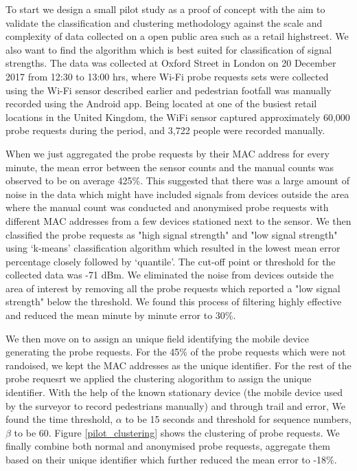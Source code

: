To start we design a small pilot study as a proof of concept with the aim to validate the classification and clustering methodology against the scale and complexity of data collected on a open public area such as a retail highstreet.
We also want to find the algorithm which is best suited for classification of signal strengths.
The data was collected at Oxford Street in London on 20 December 2017 from 12:30 to 13:00 hrs, where Wi-Fi probe requests sets were collected using the Wi-Fi sensor described earlier and pedestrian footfall was manually recorded using the Android app.
Being located at one of the busiest retail locations in the United Kingdom, the WiFi sensor captured approximately 60,000 probe requests during the period, and 3,722 people were recorded manually.

When we just aggregated the probe requests by their MAC address for every minute, the mean error between the sensor counts and the manual counts was observed to be on average 425\%.
This suggested that there was a large amount of noise in the data which might have included signals from devices outside the area where the manual count was conducted and anonymised probe requests with different MAC addresses from a few devices stationed next to the sensor.
We then classified the probe requests as "high signal strength" and "low signal strength" using `k-means' classification algorithm which resulted in the lowest mean error percentage closely followed by `quantile'.
The cut-off point or threshold for the collected data was -71 dBm.
We eliminated the noise from devices outside the area of interest by removing all the probe requests which reported a "low signal strength" below the threshold.
We found this process of filtering highly effective and reduced the mean minute by minute error to 30\%.

We then move on to assign an unique field identifying the mobile device generating the probe requests.
For the 45\% of the probe requests which were not randoised, we kept the MAC addresses as the unique identifier.
For the rest of the probe requesrt we applied the clustering alogorithm to assign the unique identifier.
With the help of the known stationary device (the mobile device used by the surveyor to record pedestrians manually) and through trail and error, We found the time threshold, $\alpha$ to be 15 seconds and threshold for sequence numbers, $\beta$ to be 60.
Figure \ref{pilot_clustering} shows the clustering of probe requests.
We finally combine both normal and anonymised probe requests, aggregate them based on their unique identifier which further reduced the mean error to -18\%.

